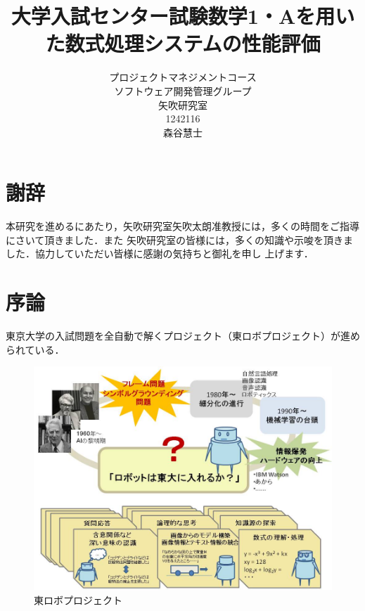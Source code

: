 \title{大学入試センター試験数学1・Aを用いた数式処理システムの性能評価}
\author{プロジェクトマネジメントコース\\
ソフトウェア開発管理グループ\\
矢吹研究室\\
1242116\\
森谷慧士}
\date{}

\maketitle

\chapter*{謝辞}

本研究を進めるにあたり，矢吹研究室矢吹太朗准教授には，多くの時間をご指導にさいて頂きました．また 矢吹研究室の皆様には，多くの知識や示唆を頂きました．協力していただい皆様に感謝の気持ちと御礼を申し 上げます．

\tableofcontents%

\chapter{序論}


東京大学の入試問題を全自動で解くプロジェクト（東ロボプロジェクト）が進められている\cite{arai2014}．

\begin{figure}[h]
\centering
\includegraphics[width=15cm]{tourobo.jpg}
\caption{東ロボプロジェクト}\label{図}
\end{figure}

